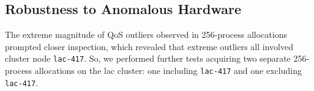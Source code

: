 





\vspace{-4.0ex}
\subsection{Robustness to Anomalous Hardware}
\label{moreno:sec:with-lac-417-vs-sans-lac-417}
\vspace{-2.0ex}

% 
The extreme magnitude of QoS outliers observed in 256-process allocations prompted closer inspection, which revealed that extreme outliers all involved cluster node \texttt{lac-417}.
So, we performed further tests acquiring two separate 256-process allocations on the lac cluster: one including \texttt{lac-417} and one excluding \texttt{lac-417}.

